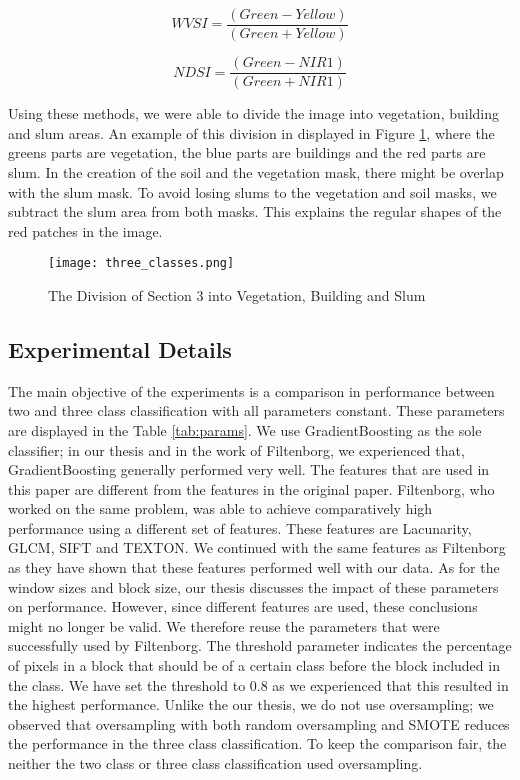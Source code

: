 \begin{equation}
\label{eq:wvsi}
WVSI = \frac{(Green - Yellow)}{(Green + Yellow)}
\end{equation}

\begin{equation}
\label{eq:ndsi}
NDSI = \frac{(Green - NIR1)}{(Green + NIR1)}
\end{equation}




Using these methods, we were able to divide the image into vegetation, building and slum areas. An example of this division in displayed in Figure \ref{fig:three_classes}, where the greens parts are vegetation, the blue parts are buildings and the red parts are slum. In the creation of the soil and the vegetation mask, there might be overlap with the slum mask. To avoid losing slums to the vegetation and soil masks, we subtract the slum area from both masks. This explains the regular shapes of the red patches in the image.



\begin{figure}[h]
	\centering
	\texttt{[image: three\_classes.png]}
	\label{fig:three_classes}
	\caption{The Division of Section 3 into Vegetation, Building and Slum}
\end{figure}



\subsection{Experimental Details}
The main objective of the experiments is a comparison in performance between two and three class classification with all parameters constant. These parameters are displayed in the Table \ref{tab:params}.
We use GradientBoosting as the sole classifier; in our thesis and in the work of Filtenborg, we experienced that, GradientBoosting generally performed very well.
The features that are used in this paper are different from the features in the original paper. Filtenborg, who worked on the same problem, was able to achieve comparatively high performance using a different set of features. These features are Lacunarity, GLCM, SIFT and TEXTON. We continued with the same features as Filtenborg as they have shown that these features performed well with our data.
As for the window sizes and block size, our thesis discusses the impact of these parameters on performance. However, since different features are used, these conclusions might no longer be valid. We therefore reuse the parameters that were successfully used by Filtenborg.
The threshold parameter indicates the percentage of pixels in a block that should be of a certain class before the block included in the class. We have set the threshold to 0.8 as we experienced that this resulted in the highest performance.
Unlike the our thesis, we do not use oversampling; we observed that oversampling with both random oversampling and SMOTE reduces the performance in the three class classification. To keep the comparison fair, the neither the two class or three class classification used oversampling.

